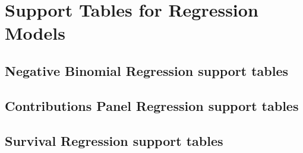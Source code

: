 \chapter{Support Tables for Regression Models}
\label{support-tables}

\section{Negative Binomial Regression support tables}





\section{Contributions Panel Regression support tables}





\section{Survival Regression support tables}





